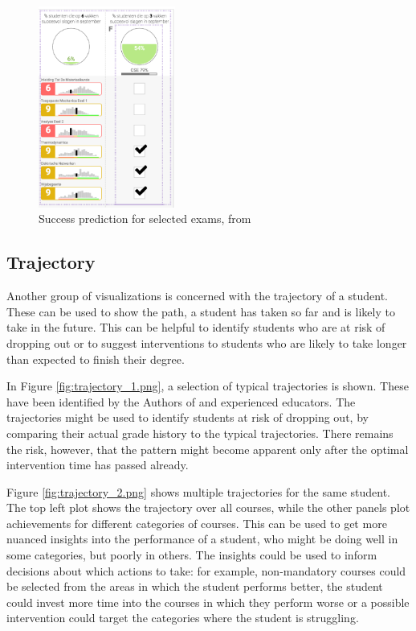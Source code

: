 \begin{figure}
    \centering
    \includegraphics[width=0.4\textwidth]{figures/success_2.png}
    \caption{Success prediction for selected exams, from \cite{LISSA}}
    \label{fig:succes_2.png}
\end{figure}

\subsection{Trajectory}
\label{subsec:trajectory}

Another group of visualizations is concerned with the trajectory of a student.
These can be used to show the path, a student has taken so far and is likely to take in the future. This can be helpful to identify students who are at risk of dropping out or to suggest interventions to students who are likely to take longer than expected to finish their degree.

In Figure \ref{fig:trajectory_1.png}, a selection of typical trajectories is shown.
These have been identified by the Authors of \cite{DegreePictures-Seed} and experienced educators.
The trajectories might be used to identify students at risk of dropping out, by comparing their actual grade history to the typical trajectories. There remains the risk, however, that the pattern might become apparent only after the optimal intervention time has passed already.

Figure \ref{fig:trajectory_2.png} shows multiple trajectories for the same student.
The top left plot shows the trajectory over all courses, while the other panels plot achievements for different categories of courses.
This can be used to get more nuanced insights into the performance of a student, who might be doing well in some categories, but poorly in others.
The insights could be used to inform decisions about which actions to take: for example, non-mandatory courses could be selected from the areas in which the student performs better, the student could invest more time into the courses in which they perform worse or a possible intervention could target the categories where the student is struggling.

